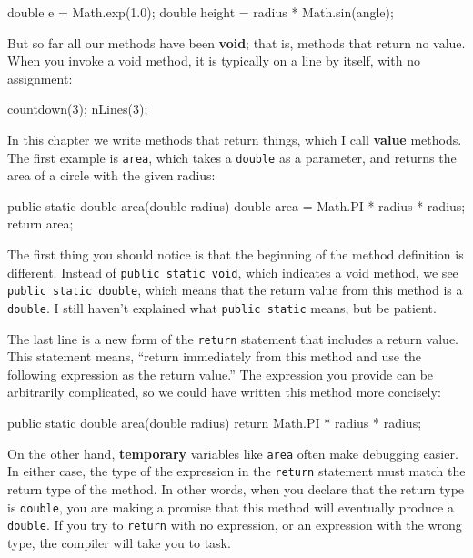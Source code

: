 \documentclass[12pt]{book}
\theoremstyle{exercise}
\begin{document}
\begin{code}
    double e = Math.exp(1.0);
    double height = radius * Math.sin(angle);
\end{code}

But so far all our methods have been {\bf void}; that is, methods that return no value.
When you invoke a void method, it is typically on a line by itself, with no assignment:

\begin{code}
    countdown(3);
    nLines(3);
\end{code}

In this chapter we write methods that return things, which I call {\bf value} methods.
The first example is {\tt area}, which takes a {\tt double} as a parameter, and returns the area of a circle with the given radius:

\begin{code}
    public static double area(double radius) {
        double area = Math.PI * radius * radius;
        return area;
    }
\end{code}


The first thing you should notice is that the beginning of the method definition is different.
Instead of {\tt public static void}, which indicates a void method, we see {\tt public static double}, which means that the return value from this method is a {\tt double}.
I still haven't explained what {\tt public static} means, but be patient.

The last line is a new form of the {\tt return} statement that includes a return value.
This statement means, ``return immediately from this method and use the following expression as the return value.''
The expression you provide can be arbitrarily complicated, so we could have written this method more concisely:

\begin{code}
    public static double area(double radius) {
        return Math.PI * radius * radius;
    }
\end{code}

On the other hand, {\bf temporary} variables like {\tt area} often make debugging easier.
In either case, the type of the expression in the {\tt return} statement must match the return type of the method.
In other words, when you declare that the return type is {\tt double}, you are making a promise that this method will eventually produce a {\tt double}.
If you try to {\tt return} with no expression, or an expression with the wrong type, the compiler will take you to task.
\end{document}
